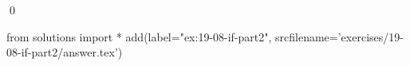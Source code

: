 
\begin{ex}
  \label{ex:19-08-if-part2}
  
  \qed
\end{ex}
\begin{python0}
from solutions import *
add(label="ex:19-08-if-part2",
    srcfilename='exercises/19-08-if-part2/answer.tex')
\end{python0}
